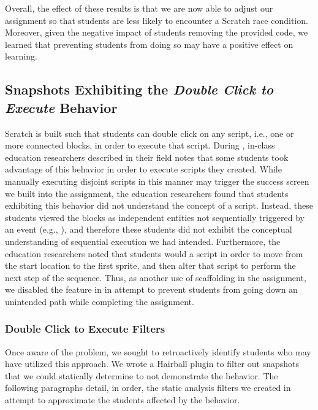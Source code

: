 Overall, the effect of these results is that we are now able to adjust our
assignment so that students are less likely to encounter a Scratch race
condition. Moreover, given the negative impact of students removing the
provided code, we learned that preventing students from doing so may have a
positive effect on learning.

\subsection{Snapshots Exhibiting the \emph{Double Click to Execute} Behavior}

Scratch is built such that students can double click on any script, i.e., one
or more connected blocks, in order to execute that script. During \sone{},
in-class education researchers described in their field notes that some
students took advantage of this behavior in order to execute scripts they
created. While manually executing disjoint scripts in this manner may trigger
the success screen we built into the assignment, the education researchers
found that students exhibiting this behavior did not understand the concept of
a script. Instead, these students viewed the blocks as independent entities not
sequentially triggered by an event (e.g., \netclicked{}), and therefore these
students did not exhibit the conceptual understanding of sequential execution
we had intended. Furthermore, the education researchers noted that students
would \dce{} a script in order to move from the start location to the first
sprite, and then alter that script to perform the next step of the
sequence. Thus, as another use of scaffolding in the assignment, we disabled
the \dce{} feature in \stwo{} in attempt to prevent students from going down an
unintended path while completing the assignment.

\subsubsection{Double Click to Execute Filters}
Once aware of the problem, we sought to retroactively identify students who may
have utilized this \dce{} approach. We wrote a Hairball plugin to filter out
snapshots that we could statically determine to not demonstrate the \dce{}
behavior. The following paragraphs detail, in order, the static analysis
filters we created in attempt to approximate the students affected by the
\dce{} behavior.

